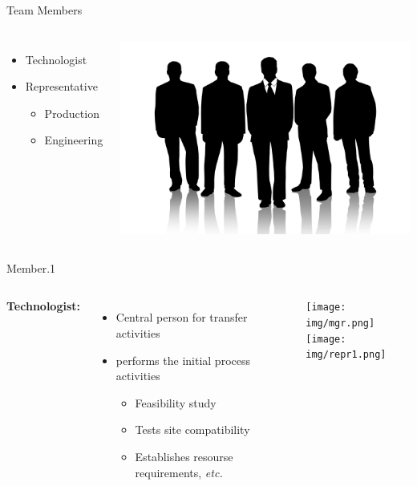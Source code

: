 \begin{frame}{Team Members}
\begin{columns}
\begin{itemize}
	\item Technologist
	\item Representative
	\begin{itemize}
		\item Production
		\item Engineering
	\end{itemize}
\end{itemize}
\includegraphics[width=\textwidth]{img/repr0.jpg}
\end{columns}
\end{frame}

\begin{frame}{Member.1}
\begin{columns}
\textbf{Technologist:}
\begin{itemize}
	\item Central person for transfer activities
	\item performs the initial process activities
	\begin{itemize}
		\item Feasibility study
		\item Tests site compatibility
		\item Establishes resourse requirements, \textit{etc.}
	\end{itemize}
\end{itemize}
\texttt{[image: img/mgr.png]}\\
\texttt{[image: img/repr1.png]}
\end{columns}
\end{frame}

